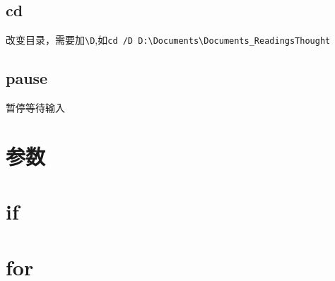 \documentclass[UTF8,a4paper,12pt]{ctexbook}
\begin{document}
		\subsection{cd }
			改变目录，需要加\verb|\D|,如\verb|cd /D D:\Documents\Documents_ReadingsThought|
				
		\subsection{pause} 暂停等待输入
		
	\section{参数}
	
	
	\section{if}
	
	
	\section{for}
	
	

 		  			
\end{document}
